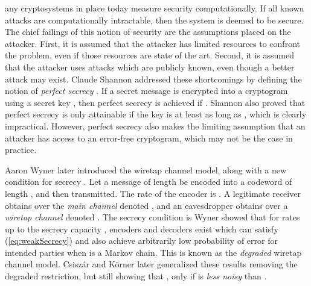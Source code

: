 \documentclass[10pt,twocolumn,twoside]{IEEEtran} \newlength{\pic}
\theoremstyle{definition}
\theoremstyle{remark}
\theoremstyle{plain}
\begin{document}
any cryptosystems in place today measure security computationally. If all known attacks are computationally intractable, then the system is deemed to be secure. The chief failings of this notion of security are the assumptions placed on the attacker. First, it is assumed that the attacker has limited resources to confront the problem, even if those resources are state of the art. Second, it is assumed that the attacker uses attacks which are publicly known, even though a better attack may exist. Claude Shannon addressed these shortcomings by defining the notion of \emph{perfect secrecy} \cite{Shannon49}. If a secret message  is encrypted into a cryptogram  using a secret key , then perfect secrecy is achieved if . Shannon also proved that perfect secrecy is only attainable if the key is at least as long as , which is clearly impractical. However, perfect secrecy also makes the limiting assumption that an attacker has access to an error-free cryptogram, which may not be the case in practice.

Aaron Wyner later introduced the wiretap channel model, along with a new condition for secrecy \cite{Wyner75}. Let a message  of length  be encoded into a codeword  of length , and then transmitted. The rate of the encoder is . A legitimate receiver obtains  over the \emph{main channel} denoted , and an eavesdropper obtains  over a \emph{wiretap channel} denoted . The secrecy condition is 
Wyner showed that for rates up to the secrecy capacity , encoders and decoders exist which can satisfy (\ref{eq:weakSecrecy}) and also achieve arbitrarily low probability of error for intended parties when  is a Markov chain. This is known as the \emph{degraded} wiretap channel model. Csisz\'{a}r and K\"{o}rner \cite{Csiszar78} later generalized these results removing the degraded restriction, but still showing that , only if  is \emph{less noisy} than .
\end{document}
